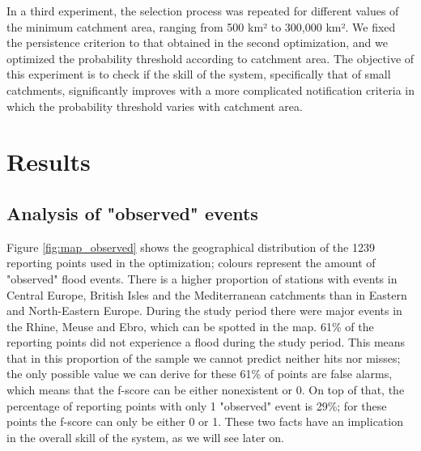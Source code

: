 \documentclass[preprint,12pt]{elsarticle}
\begin{document}
In a third experiment, the selection process was repeated for different values of the minimum catchment area, ranging from 500 km² to 300,000 km². We fixed the persistence criterion to that obtained in the second optimization, and we optimized the probability threshold according to catchment area. The objective of this experiment is to check if the skill of the system, specifically that of small catchments, significantly improves with a more complicated notification criteria in which the probability threshold varies with catchment area.

\section{Results}

\subsection{Analysis of "observed" events}

Figure \ref{fig:map_observed} shows the geographical distribution of the 1239 reporting points used in the optimization; colours represent the amount of "observed" flood events. There is a higher proportion of stations with events in Central Europe, British Isles and the Mediterranean catchments than in Eastern and North-Eastern Europe. During the study period there were major events in the Rhine, Meuse and Ebro, which can be spotted in the map. 61\% of the reporting points did not experience a flood during the study period. This means that in this proportion of the sample we cannot predict neither hits nor misses; the only possible value we can derive for these 61\% of points are false alarms, which means that the f-score  can be either nonexistent or 0. On top of that, the percentage of reporting points with only 1 "observed" event is 29\%; for these points the f-score can only be either 0 or 1. These two facts have an implication in the overall skill of the system, as we will see later on.
\end{document}
